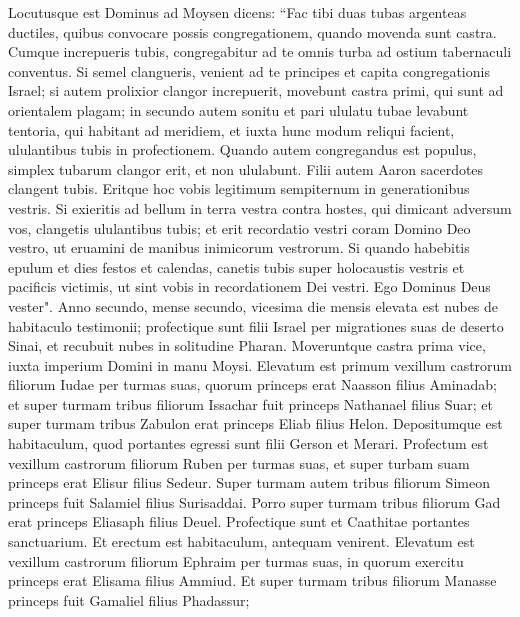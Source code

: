 \begin{biblechapter}  
\verse Locutusque est Dominus ad Moysen dicens: 
\verse “Fac tibi duas tubas argenteas ductiles, quibus convocare possis congregationem, quando movenda sunt castra. 
\verse Cumque increpueris tubis, congregabitur ad te omnis turba ad ostium tabernaculi conventus. 
\verse Si semel clangueris, venient ad te principes et capita congregationis Israel; 
\verse si autem prolixior clangor increpuerit, movebunt castra primi, qui sunt ad orientalem plagam; 
\verse in secundo autem sonitu et pari ululatu tubae levabunt tentoria, qui habitant ad meridiem, et iuxta hunc modum reliqui facient, ululantibus tubis in profectionem. 
\verse Quando autem congregandus est populus, simplex tubarum clangor erit, et non ululabunt. 
\verse Filii autem Aaron sacerdotes clangent tubis. Eritque hoc vobis legitimum sempiternum in generationibus vestris. 
\verse Si exieritis ad bellum in terra vestra contra hostes, qui dimicant adversum vos, clangetis ululantibus tubis; et erit recordatio vestri coram Domino Deo vestro, ut eruamini de manibus inimicorum vestrorum. 
\verse Si quando habebitis epulum et dies festos et calendas, canetis tubis super holocaustis vestris et pacificis victimis, ut sint vobis in recordationem Dei vestri. Ego Dominus Deus vester". 
\verse Anno secundo, mense secundo, vicesima die mensis elevata est nubes de habitaculo testimonii; 
\verse profectique sunt filii Israel per migrationes suas de deserto Sinai, et recubuit nubes in solitudine Pharan. 
\verse Moveruntque castra prima vice, iuxta imperium Domini in manu Moysi. 
\verse Elevatum est primum vexillum castrorum filiorum Iudae per turmas suas, quorum princeps erat Naasson filius Aminadab; 
\verse et super turmam tribus filiorum Issachar fuit princeps Nathanael filius Suar; 
\verse et super turmam tribus Zabulon erat princeps Eliab filius Helon. 
\verse Depositumque est habitaculum, quod portantes egressi sunt filii Gerson et Merari. 
\verse Profectum est vexillum castrorum filiorum Ruben per turmas suas, et super turbam suam princeps erat Elisur filius Sedeur. 
\verse Super turmam autem tribus filiorum Simeon princeps fuit Salamiel filius Surisaddai. 
\verse Porro super turmam tribus filiorum Gad erat princeps Eliasaph filius Deuel. 
\verse Profectique sunt et Caathitae portantes sanctuarium. Et erectum est habitaculum, antequam venirent. 
\verse Elevatum est vexillum castrorum filiorum Ephraim per turmas suas, in quorum exercitu princeps erat Elisama filius Ammiud. 
\verse Et super turmam tribus filiorum Manasse princeps fuit Gamaliel filius Phadassur; 

\end{biblechapter}
